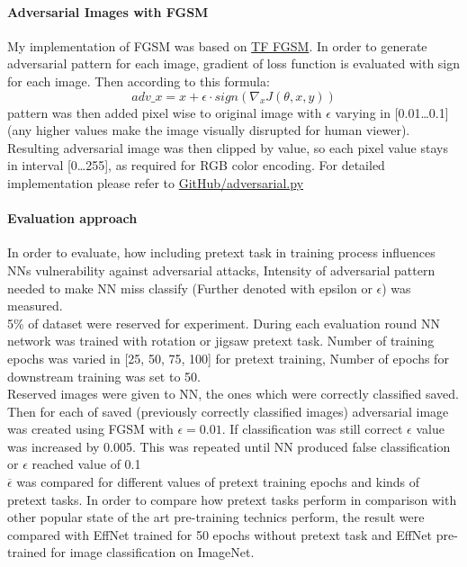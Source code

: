 \paragraph{Adversarial Images with FGSM}
My implementation of FGSM was based on \href{https://www.tensorflow.org/tutorials/generative/adversarial_fgsm}{TF FGSM}.
In order to generate adversarial pattern for each image, gradient of loss function is evaluated with sign for each image.
Then according to this formula:
\begin{equation}
    adv\_x = x + \epsilon \cdot sign(\nabla_x J(\theta, x, y))
\end{equation}
pattern was then added pixel wise to original image with $\epsilon$ varying in [0.01\ldots0.1]
(any higher values make the image visually disrupted for human viewer).
Resulting adversarial image was then clipped by value, so each pixel value stays in interval [0\ldots255],
as required for RGB color encoding.
For detailed implementation please refer to \href{https://github.com/Goofy-Goof/ISS/blob/33a2ad40b779ff230aae31c29d2edc2cf5d90406/impl/util/adversarial.py}{GitHub/adversarial.py}


\paragraph{Evaluation approach}
In order to evaluate, how including pretext task in training process influences NNs vulnerability against adversarial attacks,
Intensity of adversarial pattern needed to make NN miss classify (Further denoted with epsilon or $\epsilon$) was measured.
\\
5\% of dataset were reserved for experiment.
During each evaluation round NN network was trained with rotation or jigsaw pretext task.
Number of training epochs was varied in [25, 50, 75, 100] for pretext training, Number of epochs for downstream training was set to 50.
\\
Reserved images were given to NN, the ones which were correctly classified saved.
Then for each of saved (previously correctly classified images) adversarial image was created using FGSM with $\epsilon = 0.01$.
If classification was still correct $\epsilon$ value was increased by 0.005.
This was repeated until NN produced false classification or $\epsilon$ reached value of 0.1
\\
$\overline{\epsilon}$ was compared for different values of pretext training epochs and kinds of pretext tasks.
In order to compare how pretext tasks perform in comparison with other popular state of the art pre-training technics perform,
the result were compared with EffNet trained for 50 epochs without pretext task and EffNet pre-trained for image classification on ImageNet.